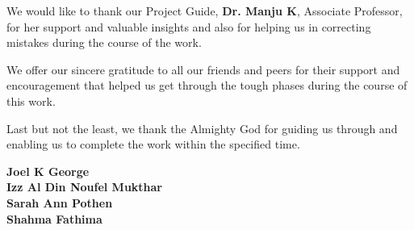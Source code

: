 \documentclass[11pt]{report}
\begin{document}
We would like to thank our Project Guide, \textbf{Dr. Manju K}, Associate Professor, for her support
and valuable insights and also for helping us in correcting mistakes during the course of the work.

We offer our sincere gratitude to all our friends and peers for their support and encouragement
that helped us get through the tough phases during the course of this work.

Last but not the least, we thank the Almighty God for guiding us through and enabling us to
complete the work within the specified time.

\vspace{1.5cm}

\begin{flushleft}
\textbf{Joel K George} \\
\textbf{Izz Al Din Noufel Mukthar}\\
\textbf{Sarah Ann Pothen} \\
\textbf{Shahma Fathima} 
\end{flushleft}
\end{document}

